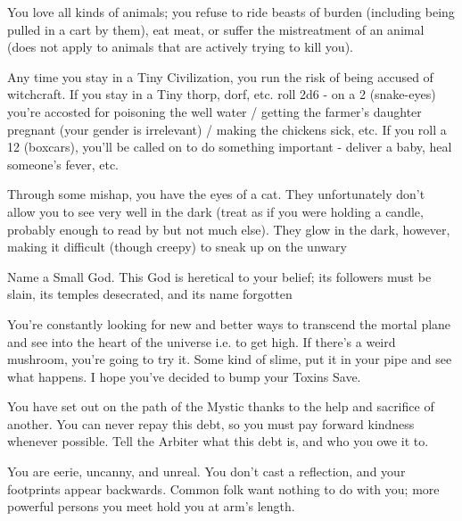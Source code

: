 
  You love all kinds of animals; you refuse to ride beasts of burden (including being pulled in a cart by them), eat meat, or suffer the mistreatment of an animal (does not apply to animals that are actively trying to kill you).

  
  Any time you stay in a Tiny Civilization, you run the risk of being accused of witchcraft.  If you stay in a Tiny thorp, dorf, etc. roll 2d6 - on a 2 (snake-eyes) you're accosted for poisoning the well water / getting the farmer's daughter pregnant (your gender is irrelevant) / making the chickens sick, etc. If you roll a 12 (boxcars), you'll be called on to do something important - deliver a baby, heal someone's fever, etc.


  Through some mishap, you have the eyes of a cat.  They unfortunately don't allow you to see very well in the dark (treat as if you were holding a candle, probably enough to read by but not much else).  They glow in the dark, however, making it difficult (though creepy) to sneak up on the unwary


  Name a Small God.  This God is heretical to your belief; its followers must be slain, its temples desecrated, and its name forgotten


  You're constantly looking for new and better ways to transcend the mortal plane and see into the heart of the universe i.e. to get high.  If there's a weird mushroom, you're going to try it.  Some kind of slime, put it in your pipe and see what happens.  I hope you've decided to bump your Toxins Save.


  You have set out on the path of the Mystic thanks to the help and sacrifice of another.  You can never repay this debt, so you must pay forward kindness whenever possible.  Tell the Arbiter what this debt is, and who you owe it to.


  You are eerie, uncanny, and unreal.  You don't cast a reflection, and your footprints appear backwards.  Common folk want nothing to do with you; more powerful persons you meet hold you at arm's length.

